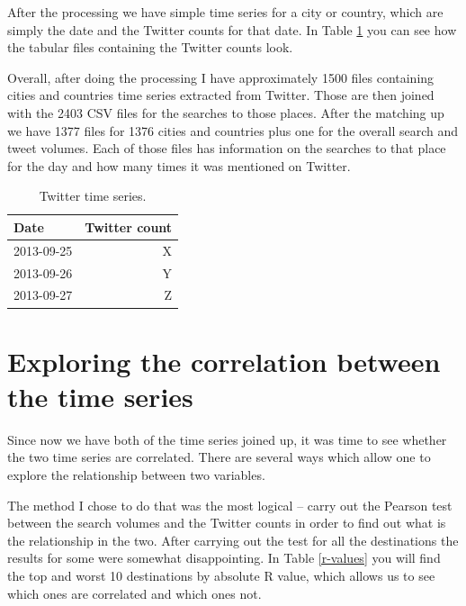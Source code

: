 \documentclass[minf,twoside,singlespacing,parskip,frontabs,notimes,11pt]{infthesis}
\begin{document}
After the processing we have simple time series for a city or country, which are simply the date and the Twitter counts for that date. In Table \ref{twit-ts} you can see how the tabular files containing the Twitter counts look. 

Overall, after doing the processing I have approximately 1500 files containing cities and countries time series extracted from Twitter. Those are then joined with the 2403 CSV files for the searches to those places. After the matching up we have 1377 files for 1376 cities and countries plus one for the overall search and tweet volumes. Each of those files has information on the searches to that place for the day and how many times it was mentioned on Twitter. 

\begin{table}[]
\begin{center}
\begin{tabular}{ l | r }
\textbf{Date} & \textbf{Twitter count}\\
\hline
2013-09-25 &  X \\
2013-09-26 &  Y \\
2013-09-27 &  Z \\
\end{tabular}
\end{center}
\caption{Twitter time series.}
\label{twit-ts}
\end{table}

\section{Exploring the correlation between the time series}

Since now we have both of the time series joined up, it was time to see whether the two time series are correlated. There are several ways which allow one to explore the relationship between two variables. 


The method I chose to do that was the most logical -- carry out the Pearson test between the search volumes and the Twitter counts in order to find out what is the relationship in the two. After carrying out the test for all the destinations the results for some were somewhat disappointing.  In Table \ref{r-values} you will find the top and worst 10 destinations by absolute R value, which allows us to see which ones are correlated and which ones not.
\end{document}
